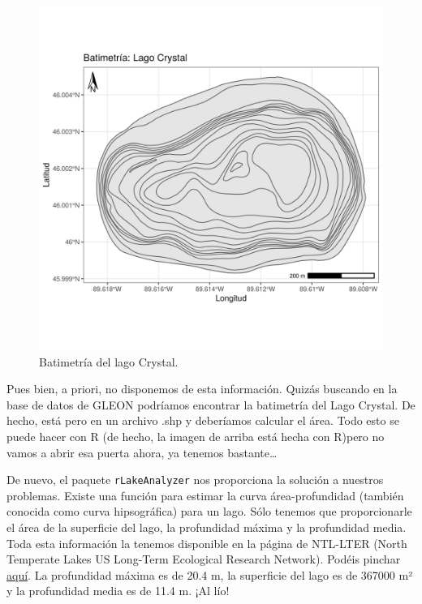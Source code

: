 \documentclass[
]{book}
\newcommand{\passthrough}[1]{#1}
\begin{document}
\begin{figure}

{\centering \includegraphics[width=1\linewidth]{Graficas/Lago_crystal_contorno} 

}

\caption{Batimetría del lago Crystal.}\label{fig:unnamed-chunk-56}
\end{figure}

Pues bien, a priori, no disponemos de esta información. Quizás buscando en la base de datos de GLEON podríamos encontrar la batimetría del Lago Crystal. De hecho, está pero en un archivo .shp y deberíamos calcular el área. Todo esto se puede hacer con R (de hecho, la imagen de arriba está hecha con R)pero no vamos a abrir esa puerta ahora, ya tenemos bastante\ldots{}

De nuevo, el paquete \passthrough{\lstinline!rLakeAnalyzer!} nos proporciona la solución a nuestros problemas. Existe una función para estimar la curva área-profundidad (también conocida como curva hipsográfica) para un lago. Sólo tenemos que proporcionarle el área de la superficie del lago, la profundidad máxima y la profundidad media. Toda esta información la tenemos disponible en la página de NTL-LTER (North Temperate Lakes US Long-Term Ecological Research Network). Podéis pinchar \href{https://lter.limnology.wisc.edu/researchsite/crystal-lake}{aquí}. La profundidad máxima es de 20.4 m, la superficie del lago es de 367000 m² y la profundidad media es de 11.4 m. ¡Al lío!
\end{document}
